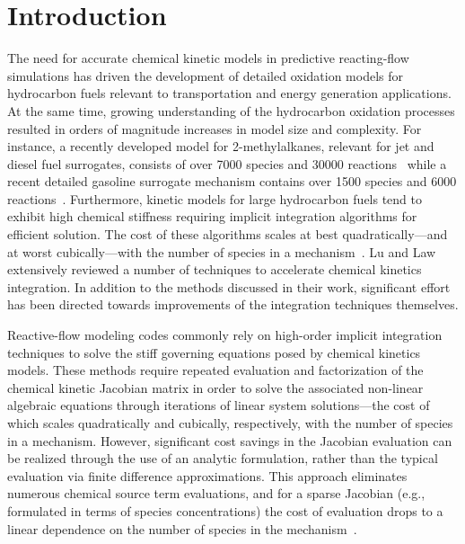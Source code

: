\documentclass[preprint]{elsarticle}
\begin{document}
\clearpage

\section{Introduction}
\label{sec:Intro}

The need for accurate chemical kinetic models in predictive reacting-flow simulations has driven the development of detailed oxidation models for hydrocarbon fuels relevant to transportation and energy generation applications.
At the same time, growing understanding of the hydrocarbon oxidation processes resulted in orders of magnitude increases in model size and complexity.
For instance, a recently developed model for 2-methylalkanes, relevant for jet and diesel fuel surrogates, consists of over 7000 species and 30000 reactions~\cite{Sarathy:2011kx} while a recent detailed gasoline surrogate mechanism contains over 1500 species and 6000 reactions~\cite{Mehl:2011jn}.
Furthermore, kinetic models for large hydrocarbon fuels tend to exhibit high chemical stiffness requiring implicit integration algorithms for efficient solution.
The cost of these algorithms scales at best quadratically---and at worst cubically---with the number of species in a mechanism~\cite{Lu:2009gh}.
Lu and Law~\cite{Lu:2009gh} extensively reviewed a number of techniques to accelerate chemical kinetics integration.
In addition to the methods discussed in their work, significant effort has been directed towards improvements of the integration techniques themselves.

Reactive-flow modeling codes commonly rely on high-order implicit integration techniques to solve the stiff governing equations posed by chemical kinetics models.
These methods require repeated evaluation and factorization of the chemical kinetic Jacobian matrix in order to solve the associated non-linear algebraic equations through iterations of linear system solutions---the cost of which scales quadratically and cubically, respectively, with the number of species in a mechanism.
However, significant cost savings in the Jacobian evaluation can be realized through the use of an analytic formulation, rather than the typical evaluation via finite difference approximations.
This approach eliminates numerous chemical source term evaluations, and for a sparse Jacobian (e.g., formulated in terms of species concentrations) the cost of evaluation drops to a linear dependence on the number of species in the mechanism~\cite{Lu:2009gh}.
\end{document}
